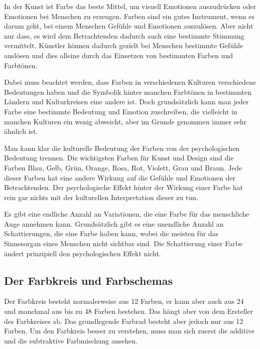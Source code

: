 In der Kunst ist Farbe das beste Mittel, um visuell Emotionen auszudrücken oder Emotionen bei Menschen zu erzeugen. Farben sind ein gutes Instrument, wenn es darum geht, bei einem Menschen Gefühle und Emotionen auszulösen. Aber nicht nur dass, es wird dem Betrachtenden dadurch auch eine bestimmte Stimmung vermittelt. Künstler können dadurch gezielt bei Menschen bestimmte Gefühle auslösen und dies alleine durch das Einsetzen von bestimmten Farben und Farbtönen.
\cite{_special_subjects} 
\cite{_line_color_form}
\cite{_drawing_basics_and_video_game_art}

Dabei muss beachtet werden, dass Farben in verschiedenen Kulturen verschiedene Bedeutungen haben und die Symbolik hinter manchen Farbtönen in bestimmten Ländern und Kulturkreisen eine andere ist. Doch grundsätzlich kann man jeder Farbe eine bestimmte Bedeutung und Emotion zuschreiben, die vielleicht in manchen Kulturen ein wenig abweicht, aber im Grunde genommen immer sehr ähnlich ist.
\cite{_special_subjects}
\cite{_line_color_form}
\cite{_drawing_basics_and_video_game_art}

Man kann klar die kulturelle Bedeutung der Farben von der psychologischen Bedeutung trennen. Die wichtigsten Farben für Kunst und Design sind die Farben Blau, Gelb, Grün, Orange, Rosa, Rot, Violett, Grau und Braun. Jede dieser Farben hat eine andere Wirkung auf die Gefühle und Emotionen der Betrachtenden. Der psychologische Effekt hinter der Wirkung einer Farbe hat rein gar nichts mit der kulturellen Interpretation dieser zu tun. 
 \cite{_special_subjects}
 \cite{_line_color_form}
 \cite{_drawing_basics_and_video_game_art}
 
Es gibt eine endliche Anzahl an Variationen, die eine Farbe für das menschliche Auge annehmen kann. Grundsätzlich gibt es eine unendliche Anzahl an Schattierungen, die eine Farbe haben kann, wobei die meisten für das Sinnesorgan eines Menschen nicht sichtbar sind. Die Schattierung einer Farbe ändert prinzipiell den psychologischen Effekt nicht.
\cite{_special_subjects}

\subsection{Der Farbkreis und Farbschemas}
Der Farbkreis besteht normalerweise aus 12 Farben, er kann aber auch aus 24 und manchmal aus bis zu 48 Farben bestehen. Das hängt aber von dem Ersteller des Farbkreises ab. Das grundlegende Farbrad besteht aber jedoch nur aus 12 Farben. Um den Farbkreis besser zu verstehen, muss man sich zuerst die additive und die subtraktive Farbmischung ansehen.  
\cite{_special_subjects}
\cite{_line_color_form}
\cite{_drawing_basics_and_video_game_art}

